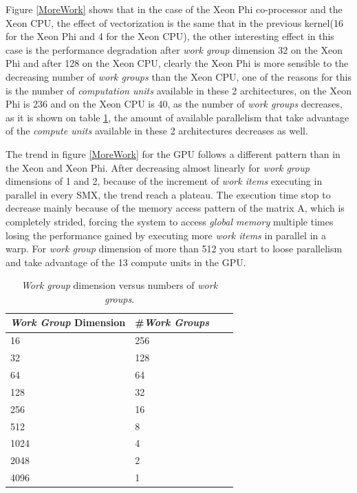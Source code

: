 \par{Figure \ref{MoreWork} shows that in the case of the Xeon Phi co-processor 
    and the Xeon CPU, the effect of vectorization
    is the same that in the previous kernel(16 for the Xeon Phi and 4 for the 
    Xeon CPU), the other interesting effect in this
    case is the performance degradation after \emph{work group} dimension 32 
    on the Xeon Phi and after 128 on the Xeon
    CPU, clearly the Xeon Phi is more sensible to the decreasing number of 
    \emph{work groups} than the Xeon CPU, one of the 
    reasons for this is the number of \emph{computation units} available in 
    these 2 architectures, on the Xeon Phi is 236 and
    on the Xeon CPU is 40, as the number of \emph{work groups} decreases, 
    as it is shown on table \ref{tab:work_groups}, the amount
    of available parallelism that take advantage of the \emph{compute units} 
    available in these 2 architectures decreases as well.}

\par{The trend in figure \ref{MoreWork} for the GPU follows a different pattern
    than in the Xeon and Xeon Phi. After decreasing almost linearly for 
    \emph{work group} dimensions of 1 and 2, because of the increment of
    \emph{work items} executing in parallel in every SMX, the trend reach a 
    plateau. The execution time stop to decrease mainly because of the memory
    access pattern of the matrix A, which is completely strided, forcing the 
    system to access \emph{global memory} multiple times losing the performance
    gained by executing more \emph{work items} in parallel in a warp. For 
    \emph{work group} dimension of more than 512 you start to loose parallelism
    and take advantage of the 13 compute units in the GPU.}

\begin{table}[!h]
    \centering
    \begin{tabular}{| l | l | l | l |}
    \hline
    \emph{Work Group} Dimension & \#\emph{Work Groups} \\ \hline
    16 & 256 \\ \hline
    32 & 128 \\ \hline
    64 & 64 \\ \hline
    128 & 32 \\ \hline
    256 & 16 \\ \hline
    512 & 8 \\ \hline
    1024 & 4 \\ \hline
    2048 & 2 \\ \hline
    4096 & 1 \\ 
    \hline
    \end{tabular}
    \caption{\emph{Work group} dimension versus numbers of \emph{work groups}.}
    \label{tab:work_groups}
\end{table}

